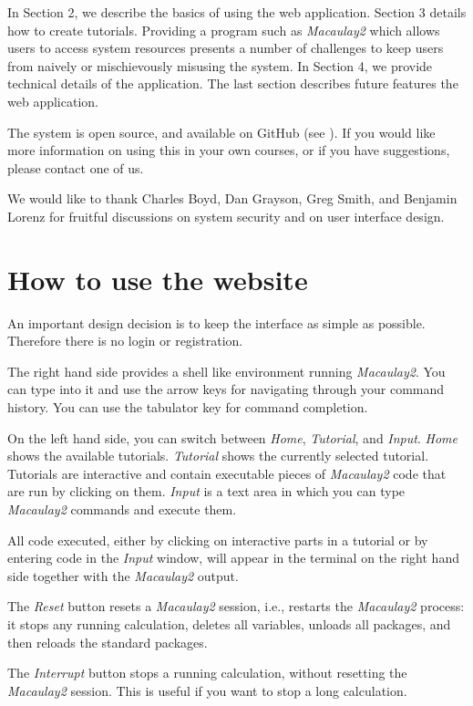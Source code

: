 \documentclass[twocolumn]{article}
\def\M2{{\it Macaulay2}}
\begin{document}
In Section 2, we describe the basics of using the web application.
Section 3 details how to create tutorials.
Providing a program such as \M2 which allows users to
access system resources presents a number of challenges to keep users
from naively or mischievously misusing the system.  In Section 4, we
provide technical details of the application.
The last section describes future features the web application.

The system is open source, and available on GitHub (see \cite{github}).
If you would like more information on using this in your own courses,
or if you have suggestions, please contact one of us.

We would like to thank Charles Boyd, Dan Grayson, Greg Smith, and Benjamin Lorenz for
fruitful discussions on system security and on user interface design.

\section{How to use the website}

An important
design decision is to keep the interface as simple as possible.
Therefore there is no login or registration.

The right hand side provides a shell like environment running
\M2. You can type into it and use the arrow keys for
navigating through your command history. You can use the tabulator 
key for command completion. 

On the left hand side, you can switch between {\it Home}, {\it
  Tutorial}, and {\it Input}. {\it Home} shows the available
 tutorials. {\it Tutorial} shows the currently selected
tutorial. Tutorials are interactive and contain executable pieces of
\M2 code that are run by clicking on them. {\it Input} is a
text area in which you can type \M2 commands and execute them.

All code executed, either by clicking on interactive parts in a
tutorial or by entering code in the {\it Input} window, will appear in 
the terminal on the right hand side together with the \M2 output.


The {\it Reset} button resets a \M2 session, i.e., restarts 
the \M2 process: it stops any running calculation, deletes all variables, 
unloads all packages, and then reloads the standard packages.

The {\it Interrupt} button stops a running calculation, without
resetting the \M2 session. This is useful if you want to stop a long calculation.
\end{document}
